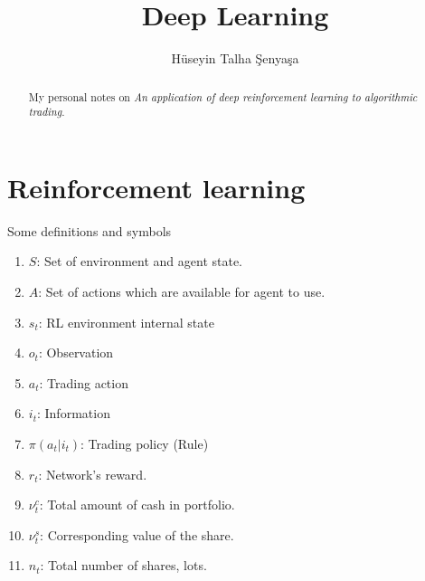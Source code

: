\documentclass[twocolumn,aps,pra,superscriptaddress,nofootinbib,longbibliography]{revtex4-2}
\begin{document}
\title{Deep Learning}

\author{H\"useyin Talha \c{S}enya\c{s}a}






\begin{abstract}
My personal notes on \textit{An application of deep reinforcement learning to algorithmic trading}.

\end{abstract}

\maketitle


\section{Reinforcement learning}

Some definitions and symbols

\begin{enumerate}
    \item \(S\): Set of environment and agent state.
    \item \(A\): Set of actions which are available for agent to use.
    \item \(s_t\): RL environment internal state
    \item \(o_t\): Observation
    \item \(a_t\): Trading action 
    \item \(i_t\): Information
    \item \(\pi(a_t|i_t)\): Trading policy (Rule)
    \item \(r_t\): Network's reward.
    \item \(\nu_{t}^c\): Total amount of cash in portfolio. 
    \item \(\nu_{t}^s\): Corresponding value of the share.
    \item \(n_t\): Total number of shares, lots. 
\end{enumerate}
\end{document}
